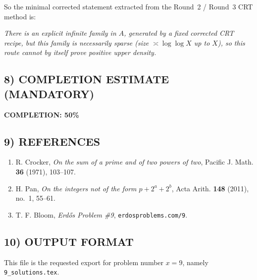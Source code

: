 So the minimal corrected statement extracted from the Round~2 / Round~3 CRT method is:

\medskip
\noindent\emph{There is an explicit infinite family in $A$, generated by a fixed corrected CRT recipe, but this family is necessarily sparse (size $\asymp \log\log X$ up to $X$), so this route cannot by itself prove positive upper density.}

\subsection*{8) COMPLETION ESTIMATE (MANDATORY)}

\noindent\textbf{COMPLETION: 50\%}

\subsection*{9) REFERENCES}

\begin{enumerate}
\item R. Crocker, \emph{On the sum of a prime and of two powers of two}, Pacific J. Math. \textbf{36} (1971), 103--107.
\item H. Pan, \emph{On the integers not of the form $p+2^a+2^b$}, Acta Arith. \textbf{148} (2011), no.~1, 55--61.
\item T. F. Bloom, \emph{Erd\H{o}s Problem \#9}, \texttt{erdosproblems.com/9}.
\end{enumerate}

\subsection*{10) OUTPUT FORMAT}

This file is the requested export for problem number $x=9$, namely \texttt{9\_solutions.tex}.
